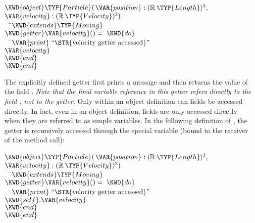 \begin{Fortress}
\(\KWD{object} \TYP{Particle}(\null\)\pushtabs\=\+\(\VAR{position} \mathrel{\mathtt{:}} (\mathbb{R}\mskip 4mu plus 4mu\TYP{Length})^{3},\)\\
\(                \VAR{velocity} \mathrel{\mathtt{:}} (\mathbb{R}\mskip 4mu plus 4mu\TYP{Velocity})^{3})\)\-\\\poptabs
{\tt~~}\pushtabs\=\+\(  \KWD{extends} \TYP{Moving}\)\\
\(  \KWD{getter} \VAR{velocity}() = \;\KWD{do}\)\\
{\tt~~}\pushtabs\=\+\(    \VAR{print}\;\hbox{\rm``\STR{velocity~getter~accessed}''}\)\\
\(    \VAR{velocity}\)\-\\\poptabs
\(  \KWD{end}\)\-\\\poptabs
\(\KWD{end}\)
\end{Fortress}

The explicitly defined getter first prints a message and then returns
the value of the
field . \emph{Note that the final variable reference in this getter refers
directly to the field , not to the getter.} Only within an object definition
can fields be accessed directly. In fact, even in an object definition, fields are only
accessed directly when they are referred to as simple variables. In the following definition
of , the getter  is recursively accessed through the special variable
 (bound to the receiver of the method call):

\begin{Fortress}
\(\KWD{object} \TYP{Particle}(\null\)\pushtabs\=\+\(\VAR{position} \mathrel{\mathtt{:}} (\mathbb{R}\mskip 4mu plus 4mu\TYP{Length})^{3},\)\\
\(                \VAR{velocity} \mathrel{\mathtt{:}} (\mathbb{R}\mskip 4mu plus 4mu\TYP{Velocity})^{3})\)\-\\\poptabs
{\tt~~}\pushtabs\=\+\(  \KWD{extends} \TYP{Moving}\)\\
\(  \KWD{getter} \VAR{velocity}() = \;\KWD{do}\)\\
{\tt~~}\pushtabs\=\+\(    \VAR{print}\;\hbox{\rm``\STR{velocity~getter~accessed}''}\)\\
\(    \mathord{\KWD{self}}.\VAR{velocity}\)\-\\\poptabs
\(  \KWD{end}\)\-\\\poptabs
\(\KWD{end}\)
\end{Fortress}

